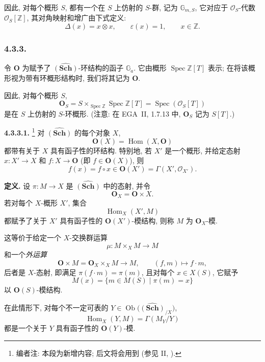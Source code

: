因此, 对每个概形 \(S\), 都有一个在 \(S\) 上仿射的 \(S\)-群,
记为 \(\mathbb G_{m,S}\), 它对应于 \(\mathcal O_S\)-代数
\(\mathcal O_S[\mathbb Z]\), 其对角映射和增广由下式定义:
\[
  \Delta(x)=x\otimes x,
  \qquad
  \varepsilon(x)=1,
  \qquad x\in\mathbb Z.
\]

\subsubsection*{4.3.3.}

令 \(\mathbf O\) 为赋予了 \(\widehat{(\mathbf{Sch})}\)-环结构的函子
\(\mathbb G_a\). 它由概形 \(\operatorname{Spec}\mathbb Z[T]\) 表示;
在将该概形视为带有环概形结构时, 我们将其记为 \(\mathbf O\).

因此, 对每个概形 \(S\),
\[
  \mathbf O_S
    =S\times_{\operatorname{Spec}\mathbb Z}
       \operatorname{Spec}\mathbb Z[T]
    =\operatorname{Spec}(\mathcal O_S[T])
\]
是在 \(S\) 上仿射的 \(S\)-环概形. (注意: 在 EGA~II,
1.7.13 中, \(\mathbf O_S\) 记为 \(S[T]\).)

\medskip
\noindent{}\textbf{4.3.3.1.}
\footnote{编者注: 本段为新增内容; 后文将会用到 (参见 II,
).}
对 \(\widehat{(\mathbf{Sch})}\) 的每个对象 \(X\),
\[
  \mathbf O(X)=\operatorname{Hom}(X,\mathbf O)
\]
都带有关于 \(X\) 具有函子性的环结构. 特别地, 若 \(X'\) 是一个概形,
并给定态射 \(x:X'\to X\) 和 \(f:X\to\mathbf O\)
(即 \(f\in\mathbf O(X)\)), 则
\[
  f(x)=f\circ x
    \in\mathbf O(X')
    =\Gamma(X',\mathcal O_{X'}).
\]

\medskip
\noindent\textbf{定义.}
设 \(\pi:M\to X\) 是 \(\widehat{(\mathbf{Sch})}\) 中的态射, 并令
\[
  \mathbf O_X=\mathbf O\times X.
\]
若对每个 \(X\)-概形 \(X'\), 集合
\[
  \operatorname{Hom}_X(X',M)
\]
都赋予了关于 \(X'\) 具有函子性的 \(\mathbf O(X')\)-模结构,
则称 \(M\) 为 \(\mathbf O_X\)-模.

这等价于给定一个 \(X\)-交换群运算
\[
  \mu:M\times_X M\longrightarrow M
\]
和一个\emph{外运算}
\[
  \mathbf O\times M
    =\mathbf O_X\times_X M
    \longrightarrow M,
  \qquad
  (f,m)\longmapsto f\cdot m,
\]
后者是 \(X\)-态射, 即满足 \(\pi(f\cdot m)=\pi(m)\), 且对每个
\(x\in X(S)\), 它赋予
\[
  M(x)=\{m\in M(S)\mid\pi(m)=x\}
\]
以 \(\mathbf O(S)\)-模结构.

在此情形下, 对每个不一定可表的
\(Y\in\operatorname{Ob}\bigl(\widehat{(\mathbf{Sch})}_{/X}\bigr)\),
\[
  \operatorname{Hom}_X(Y,M)=\Gamma(M_Y/Y)
\]
都是一个关于 \(Y\) 具有函子性的 \(\mathbf O(Y)\)-模.

